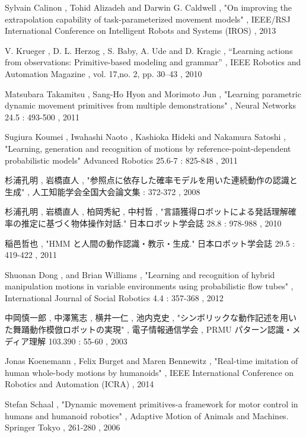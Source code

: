 ﻿%
\begin{thebibliography}{99}%
Sylvain Calinon , Tohid Alizadeh and Darwin G. Caldwell , "On improving the extrapolation capability of task-parameterized movement models" , IEEE/RSJ International Conference on Intelligent Robots and Systems (IROS) , 2013

V. Krueger , D. L. Herzog , S. Baby, A. Ude and D. Kragic , “Learning actions from observations: Primitive-based modeling and grammar” , IEEE Robotics and Automation Magazine , vol. 17,no. 2, pp. 30–43 , 2010

Matsubara Takamitsu , Sang-Ho Hyon and Morimoto Jun , "Learning parametric dynamic movement primitives from multiple demonstrations" , Neural Networks 24.5 : 493-500 , 2011

Sugiura Koumei , Iwahashi Naoto , Kashioka Hideki and Nakamura Satoshi , "Learning, generation and recognition of motions by reference-point-dependent probabilistic models" Advanced Robotics 25.6-7 : 825-848 , 2011

杉浦孔明 , 岩橋直人 , "参照点に依存した確率モデルを用いた連続動作の認識と生成" , 人工知能学会全国大会論文集 : 372-372 , 2008

杉浦孔明 , 岩橋直人 , 柏岡秀紀 , 中村哲 , "言語獲得ロボットによる発話理解確率の推定に基づく物体操作対話." 日本ロボット学会誌 28.8 : 978-988 , 2010

稲邑哲也 , "HMM と人間の動作認識・教示・生成." 日本ロボット学会誌 29.5 : 419-422 , 2011

Shuonan Dong , and Brian Williams , "Learning and recognition of hybrid manipulation motions in variable environments using probabilistic flow tubes" , International Journal of Social Robotics 4.4 : 357-368 , 2012

中岡慎一郎 , 中澤篤志 , 横井一仁 , 池内克史 , "シンボリックな動作記述を用いた舞踊動作模倣ロボットの実現" , 電子情報通信学会 , PRMU パターン認識・メディア理解 103.390 : 55-60 , 2003

Jonas Koenemann , Felix Burget and Maren Bennewitz , "Real-time imitation of human whole-body motions by humanoids" , IEEE International Conference on Robotics and Automation (ICRA) , 2014

Stefan Schaal , "Dynamic movement primitives-a framework for motor control in humans and humanoid robotics" , Adaptive Motion of Animals and Machines. Springer Tokyo , 261-280 , 2006


\end{thebibliography}
